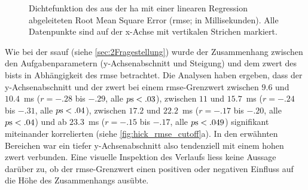 \documentclass[11pt, twoside, a4paper]{book}		%
\begin{document}

\begin{figure}[t]
	\centering
	\begin{adjustbox}{width=1\textwidth}
		
	\end{adjustbox}
	\caption[Dichtefunktion des aus der \gls{ha} mit einer linearen Regression abgeleiteten \gls{rmse}]{Dichtefunktion des aus der \gls{ha} mit einer linearen Regression abgeleiteten Root Mean Square Error (\gls{rmse}; in Millisekunden).  Alle Datenpunkte sind auf der x-Achse mit vertikalen Strichen markiert.}
	\label{fig:hick_rmse_density}
\end{figure}

Wie bei der \gls{ssauf} (siehe \autoref{sec:2Fragestellung}) wurde der Zusammenhang zwischen den Aufgabenparametern (y-Ach\-sen\-ab\-schnitt und Steigung) und dem \gls{zwert} des \gls{bist}s in Abhängigkeit des \gls{rmse} betrachtet. Die Analysen haben ergeben, dass der y-Ach\-sen\-ab\-schnitt und der \gls{zwert} bei einem \gls{rmse}-Grenzwert zwischen $9.6$ und $10.4$~ms ($r = -.28$ bis $ -.29$, alle $p\textnormal{s} < .03$), zwischen $11$ und $15.7$~ms ($r = -.24$ bis $ -.31$, alle $p\textnormal{s} < .04$), zwischen $17.2$ und $22.2$~ms ($r = -.17$ bis $ -.20$, alle $p\textnormal{s} < .04$) und ab $23.3$~ms ($r = -.15$ bis $ -.17$, alle $p\textnormal{s} < .049$) signifikant miteinander korrelierten (siehe \autoref{fig:hick_rmse_cutoff}a). In den erwähnten Bereichen war ein tiefer y-Ach\-sen\-ab\-schnitt also tendenziell mit einem hohen \gls{zwert} verbunden. Eine visuelle Inspektion des Verlaufs liess keine Aussage darüber zu, ob der \gls{rmse}-Grenzwert einen positiven oder negativen Einfluss auf die Höhe des Zusammenhangs ausübte.
\end{document}
